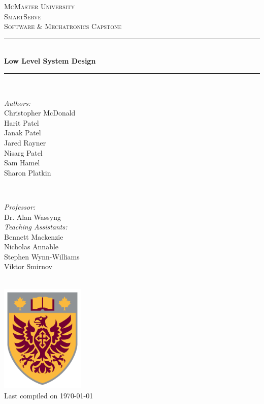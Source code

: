 \documentclass[11pt]{article}
\begin{document}
\begin{titlepage}
	\newcommand{\HRule}{\rule{\linewidth}{0.2mm}}
	\begin{center}
	\textsc{\LARGE McMaster University}\\[1.5cm]

	\textsc{\Large SmartServe}\\[0.5cm]
	\textsc{\large Software \& Mechatronics Capstone}\\[0.5cm]

	\HRule\\[0.4cm]
		{\huge\bfseries Low Level System Design}\\[0.4cm]
	\HRule\\[0.4cm]

	\begin{minipage}[t][][t]{0.5\textwidth}
		\begin{flushleft} \large
			\emph{Authors:}\\
			Christopher McDonald\\
			Harit Patel \\
			Janak Patel \\
			Jared Rayner  \\
			Nisarg Patel  \\
			Sam Hamel \\
			Sharon Platkin \\
		\end{flushleft}
	\end{minipage}
	~
	\begin{minipage}[t][][t]{0.4\textwidth}
		\begin{flushright} \large
			\emph{Professor:} \\
			Dr. Alan Wassyng \\[0.4cm]
			\emph{Teaching Assistants:} \\
			Bennett Mackenzie \\
			Nicholas Annable \\
			Stephen Wynn-Williams \\
			Viktor Smirnov
		\end{flushright}
	\end{minipage}\\[2cm]

	\includegraphics[width=0.3\textwidth]{../logo.png} \\
	{\large Last compiled on \today}
	\end{center}

\end{titlepage}
\end{document}
